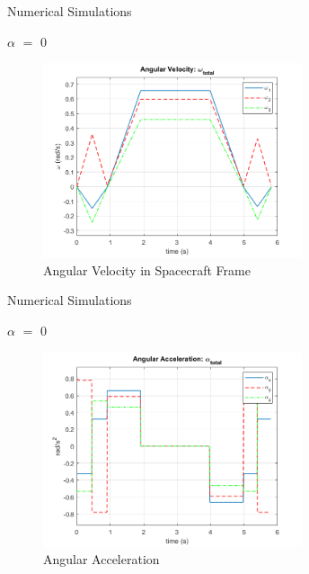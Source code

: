 \documentclass{beamer}
\begin{document}
\begin{frame}{Numerical Simulations}
	\begin{block}{$\alpha$ $=$ 0}
		
		
		\begin{figure}[H]
			\label{fig:ang_vel_phi_total_alpha0}
			\begin{center}
				\includegraphics[width=3in]{figures/alpha0/ang_vel.png}
			\end{center}
			\caption{Angular Velocity in Spacecraft Frame}
		\end{figure}
		
	\end{block}
\end{frame}
\begin{frame}{Numerical Simulations}
	\begin{block}{$\alpha$ $=$ 0}
		
		
		\begin{figure}[H]
			\label{fig:ang_accel_total_alpha0}
			\begin{center}
				\includegraphics[width=3in]{figures/alpha0/ang_accel.png}
			\end{center}
			\caption{Angular Acceleration}
		\end{figure}
		
	\end{block}
\end{frame}
\end{document}
